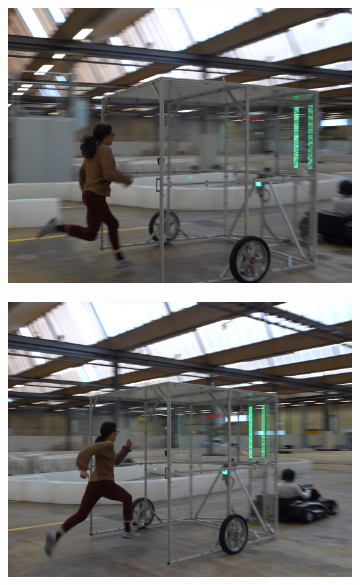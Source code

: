 \documentclass[a4paper,12pt,oneside]{book}
\begin{document}
\begin{figure}[h!]
\begin{subfigure}[b]{0.32\textwidth}
        \includegraphics[width=\textwidth]{SteadyState/ss7.png}
    \end{subfigure}
    \hfill
    \begin{subfigure}[b]{0.32\textwidth}
        \includegraphics[width=\textwidth]{SteadyState/ss8.png}
    \end{subfigure}
    \hfill
    \begin{subfigure}[b]{0.32\textwidth}

\end{subfigure}
\end{figure}
\end{document}
